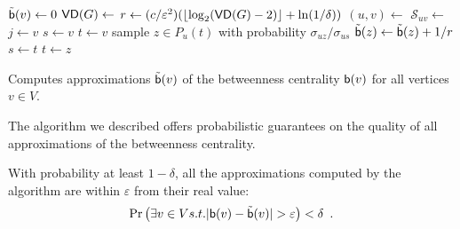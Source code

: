 \begin{algorithm}[h]
   \DontPrintSemicolon
  {
  $\tilde{\mathsf{b}}(v)\leftarrow 0$
  }
  $\mathsf{VD}(G)\leftarrow$\label{alg:diamcomp}\; 
  $r\leftarrow (c/\varepsilon^2)(\lfloor\log_2(\mathsf{VD}(G)-2)\rfloor+\ln(1/\delta))$\;
  {\label{algline:forloop}
  $(u,v)\leftarrow$\;
  $\mathcal{S}_{uv}\leftarrow$\;
  {
  $j\leftarrow v$\;
  $s\leftarrow v$\;
  $t\leftarrow v$\;
   {
  sample $z\in P_u(t)$ with probability $\sigma_{uz}/\sigma_{us}$\;
   {
  $\tilde{\mathsf{b}}(z) \leftarrow \tilde{\mathsf{b}}(z)+1/r$\;
  $s\leftarrow t$\;
  $t\leftarrow z$\;
  }
  }
  }
  } %
  \caption{Computes approximations $\tilde{\mathsf{b}}(v)$ of the betweenness
  centrality $\mathsf{b}(v)$ for all vertices $v\in V$.}
  \label{alg:algorithm}
\end{algorithm}

The algorithm we described offers probabilistic guarantees on the quality of all
approximations of the betweenness centrality.
\begin{lemma}\label{lem:correctness}
  With probability at least $1-\delta$, all the approximations computed by the
  algorithm are within $\varepsilon$ from their real value:
  \[
  \Pr\left(\exists v\in V \mbox{ s.t. }
  |\betw(v)-\tilde\betw(v)|>\varepsilon\right)<\delta\enspace .
  \]
\end{lemma}

